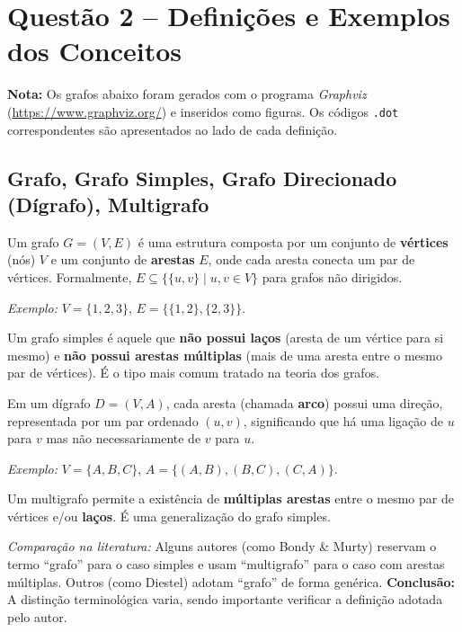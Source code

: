 \documentclass[12pt,a4paper]{article}
\begin{document}
\section{Questão 2 -- Definições e Exemplos dos Conceitos}

\noindent\textbf{Nota:} Os grafos abaixo foram gerados com o programa \textit{Graphviz} (\url{https://www.graphviz.org/}) e inseridos como figuras. Os códigos \texttt{.dot} correspondentes são apresentados ao lado de cada definição.

\subsection{Grafo, Grafo Simples, Grafo Direcionado (Dígrafo), Multigrafo}

\begin{description}[leftmargin=0pt]
  \item[Grafo] Um grafo $G = (V, E)$ é uma estrutura composta por um conjunto de \textbf{vértices} (nós) $V$ e um conjunto de \textbf{arestas} $E$, onde cada aresta conecta um par de vértices. Formalmente, $E \subseteq \{\{u,v\} \mid u, v \in V\}$ para grafos não dirigidos.

  \textit{Exemplo:} $V = \{1, 2, 3\}$, $E = \{\{1,2\}, \{2,3\}\}$.

  \item[Grafo Simples] Um grafo simples é aquele que \textbf{não possui laços} (aresta de um vértice para si mesmo) e \textbf{não possui arestas múltiplas} (mais de uma aresta entre o mesmo par de vértices). É o tipo mais comum tratado na teoria dos grafos.

  \item[Grafo Direcionado (Dígrafo)] Em um dígrafo $D = (V, A)$, cada aresta (chamada \textbf{arco}) possui uma direção, representada por um par ordenado $(u, v)$, significando que há uma ligação de $u$ para $v$ mas não necessariamente de $v$ para $u$.

  \textit{Exemplo:} $V = \{A, B, C\}$, $A = \{(A,B), (B,C), (C,A)\}$.

  \item[Multigrafo] Um multigrafo permite a existência de \textbf{múltiplas arestas} entre o mesmo par de vértices e/ou \textbf{laços}. É uma generalização do grafo simples.

  \textit{Comparação na literatura:} Alguns autores (como Bondy \& Murty) reservam o termo ``grafo'' para o caso simples e usam ``multigrafo'' para o caso com arestas múltiplas. Outros (como Diestel) adotam ``grafo'' de forma genérica. \textbf{Conclusão:} A distinção terminológica varia, sendo importante verificar a definição adotada pelo autor.
\end{description}
\end{document}
